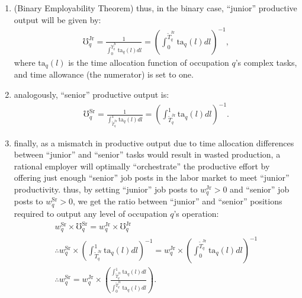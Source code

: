 \documentclass[hidelinks, nonatbib]{elsarticle}
\begin{document}
\begin{enumerate}
    \item (Binary Employability Theorem) thus, in the binary case, ``junior'' productive output will be given by:
    \begin{gather}
        \mho_{q}^{\text{Jr}} =
        \frac{
            1
        }{
            \int_{0}^{\tilde{T}_{q}^{\text{Jr}}}
            \text{ta}_q(l)
            dl
        } = 
        \left(
            \int_{0}^{\tilde{T}_{q}^{\text{Jr}}}
                \text{ta}_q(l)
                dl
        \right) ^ {-1}
        ,
    \end{gather}
    where $\text{ta}_q(l)$ is the time allocation function of occupation $q$'s complex tasks, and time allowance (the numerator) is set to one.
    \item analogously, ``senior'' productive output is:
    \begin{gather}
        \mho_{q}^{\text{Sr}} =
        \frac{
            1
        }{
            \int_{\tilde{T}_{q}^{\text{Jr}}}^{1}
            \text{ta}_q(l)
            dl
        } = 
        \left(
            \int_{\tilde{T}_{q}^{\text{Jr}}}^{1}
                \text{ta}_q(l)
                dl
        \right) ^ {-1}
        .
    \end{gather}
    \item finally, as a mismatch in productive output due to time allocation differences between ``junior'' and ``senior'' tasks would result in wasted production, a rational employer will optimally ``orchestrate'' the productive effort by offering just enough ``senior'' job posts in the labor market to meet ``junior'' productivity. thus, by setting ``junior'' job posts to $w_{q}^{\text{Jr}} > 0$ and ``senior'' job posts to $w_{q}^{\text{Sr}} > 0$, we get the ratio between ``junior'' and ``senior'' positions required to output any level of occupation $q$'s operation:
    \begin{gather}
        w_{q}^{\text{Sr}} \times 
        \mho_{q}^{\text{Sr}} = 
        w_{q}^{\text{Jr}} \times 
        \mho_{q}^{\text{Jr}}
        \\
        \therefore
        w_{q}^{\text{Sr}} \times 
        \left(
            \int_{\tilde{T}_{q}^{\text{Jr}}}^{1}
                \text{ta}_q(l)
                dl
        \right) ^ {-1}
        = 
        w_{q}^{\text{Jr}} \times 
        \left(
            \int_{0}^{\tilde{T}_{q}^{\text{Jr}}}
                \text{ta}_q(l)
                dl
        \right) ^ {-1}
        \\
        \therefore
        w_{q}^{\text{Sr}}
        = 
        w_{q}^{\text{Jr}}
        \times
        \left(
            \frac{
                \int_{\tilde{T}_{q}^{\text{Jr}}}^{1}
                    \text{ta}_q(l)
                    dl
            }{
                \int_{0}^{\tilde{T}_{q}^{\text{Jr}}}
                    \text{ta}_q(l)
                    dl
            }
        \right)
        .
    \end{gather}


\end{enumerate}
\end{document}
